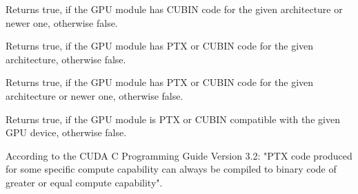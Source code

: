Returns true, if the GPU module has CUBIN code for the given architecture or newer one, otherwise false.

\begin{description}
\end{description}


Returns true, if the GPU module has PTX or CUBIN code for the given architecture, otherwise false.

\begin{description}
\end{description}


Returns true, if the GPU module has PTX or CUBIN code for the given architecture or newer one, otherwise false.

\begin{description}
\end{description}


Returns true, if the GPU module is PTX or CUBIN compatible with the given GPU device, otherwise false.

\begin{description}
\end{description}

According to the CUDA C Programming Guide Version 3.2: "PTX code produced for some specific compute capability can always be compiled to binary code of greater or equal compute capability". 

